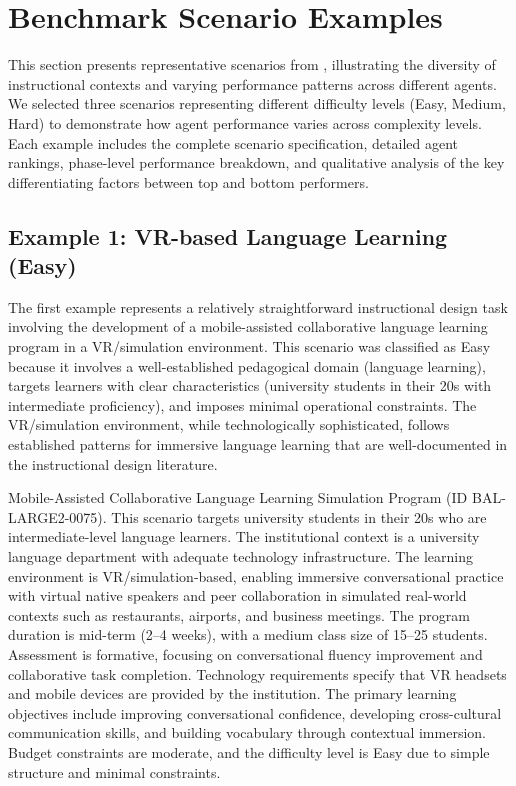 \section{Benchmark Scenario Examples}
\label{app:examples}

This section presents representative scenarios from \benchmark{}, illustrating the diversity of instructional contexts and varying performance patterns across different agents. We selected three scenarios representing different difficulty levels (Easy, Medium, Hard) to demonstrate how agent performance varies across complexity levels. Each example includes the complete scenario specification, detailed agent rankings, phase-level performance breakdown, and qualitative analysis of the key differentiating factors between top and bottom performers.

\subsection{Example 1: VR-based Language Learning (Easy)}

The first example represents a relatively straightforward instructional design task involving the development of a mobile-assisted collaborative language learning program in a VR/simulation environment. This scenario was classified as Easy because it involves a well-established pedagogical domain (language learning), targets learners with clear characteristics (university students in their 20s with intermediate proficiency), and imposes minimal operational constraints. The VR/simulation environment, while technologically sophisticated, follows established patterns for immersive language learning that are well-documented in the instructional design literature.

\begin{tcolorbox}[colback=blue!5!white, colframe=blue!50!black, breakable]
\small
Mobile-Assisted Collaborative Language Learning Simulation Program (ID BAL-LARGE2-0075). This scenario targets university students in their 20s who are intermediate-level language learners. The institutional context is a university language department with adequate technology infrastructure. The learning environment is VR/simulation-based, enabling immersive conversational practice with virtual native speakers and peer collaboration in simulated real-world contexts such as restaurants, airports, and business meetings. The program duration is mid-term (2--4 weeks), with a medium class size of 15--25 students. Assessment is formative, focusing on conversational fluency improvement and collaborative task completion. Technology requirements specify that VR headsets and mobile devices are provided by the institution. The primary learning objectives include improving conversational confidence, developing cross-cultural communication skills, and building vocabulary through contextual immersion. Budget constraints are moderate, and the difficulty level is Easy due to simple structure and minimal constraints.
\end{tcolorbox}

